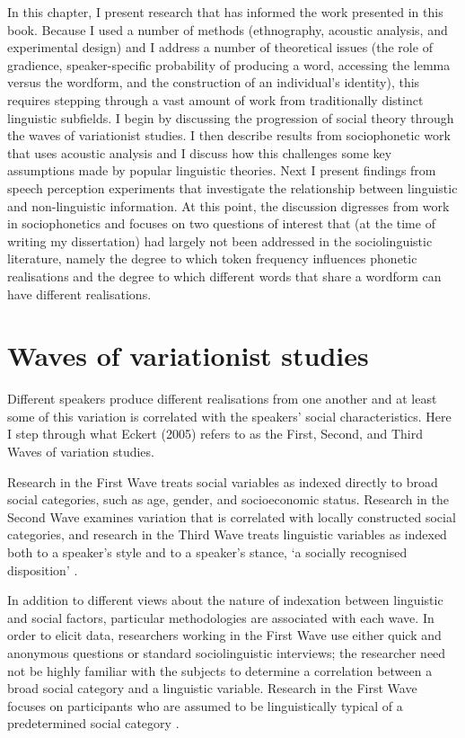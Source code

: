 In this chapter, I present research that has informed the work presented in this book.  Because I used a number of methods (ethnography, acoustic analysis, and experimental design) and I address a number of theoretical issues (the role of gradience, speaker-specific probability of producing a word, accessing the lemma versus the wordform, and the construction of an individual's identity), this requires stepping through a vast amount of work from traditionally distinct linguistic subfields.  I begin by discussing the progression of social theory through the waves of variationist studies.  I then describe results from sociophonetic work that uses acoustic analysis and I discuss how this challenges some key assumptions made by popular linguistic theories.  Next I present findings from speech perception experiments that investigate the relationship between linguistic and non-linguistic information.  At this point, the discussion digresses from work in sociophonetics and focuses on two questions of interest that (at the time of writing my dissertation) had largely not been addressed in the sociolinguistic literature, namely the degree to which token frequency influences phonetic realisations and the degree to which different words that share a wordform can have different realisations. 
						      
\section{Waves of variationist studies}\label{sec:waves}

Different speakers produce different realisations from one another and at least some of this variation is correlated with the speakers' social characteristics.  Here I step through what Eckert (2005) refers to as the First, Second, and Third Waves of variation studies.  

Research in the First Wave treats social variables as indexed directly to broad social categories, such as age, gender, and socioeconomic status.  Research in the Second Wave examines variation that is correlated with locally constructed social categories, and research in the Third Wave treats linguistic variables as indexed both to a speaker's style and to a speaker's stance, `a socially recognised disposition' \cite[2]{ochs1990}.   

In addition to different views about the nature of indexation between linguistic and social factors, particular methodologies are associated with each wave.   In order to elicit data, researchers working in the First Wave use either quick and anonymous questions or standard sociolinguistic interviews; the researcher need not be highly familiar with the subjects to determine a correlation between a broad social category and a linguistic variable.  Research in the First Wave focuses on participants who are assumed to be linguistically typical of a predetermined social category \cite[35]{milroy1987}.

